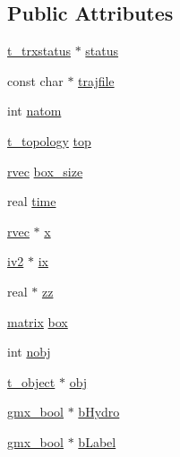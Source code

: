 \subsection*{\-Public \-Attributes}
\begin{DoxyCompactItemize}
\item 
\hyperlink{structt__trxstatus}{t\-\_\-trxstatus} $\ast$ \hyperlink{structt__manager_a89c5037729607693b806676b5ea40ddc}{status}
\item 
const char $\ast$ \hyperlink{structt__manager_affe27287f8de64fa26a53f08c71c2e9b}{trajfile}
\item 
int \hyperlink{structt__manager_aa51428daf8159772775f26bd8b29605c}{natom}
\item 
\hyperlink{structt__topology}{t\-\_\-topology} \hyperlink{structt__manager_ae5afaaf9bd7e00ae299886beb0c2675d}{top}
\item 
\hyperlink{share_2template_2gromacs_2types_2simple_8h_aa02a552a4abd2f180c282a083dc3a999}{rvec} \hyperlink{structt__manager_aa74285189d07bed0bf256da7be4f4a71}{box\-\_\-size}
\item 
real \hyperlink{structt__manager_a60f942876a3e42297e61ea208dbd319a}{time}
\item 
\hyperlink{share_2template_2gromacs_2types_2simple_8h_aa02a552a4abd2f180c282a083dc3a999}{rvec} $\ast$ \hyperlink{structt__manager_a3d0cc6a8765bec121107d8b69bc6f2d4}{x}
\item 
\hyperlink{share_2template_2gromacs_23dview_8h_a128b80c454eff54d00483f9702eb4da5}{iv2} $\ast$ \hyperlink{structt__manager_a850ad66278973e1345851a7929b52304}{ix}
\item 
real $\ast$ \hyperlink{structt__manager_a37bbd19cd371c96eb9764d79a87bbcf6}{zz}
\item 
\hyperlink{share_2template_2gromacs_2types_2simple_8h_a7ea9c2a830d3f743b887387e33645a83}{matrix} \hyperlink{structt__manager_a63a61042cfd2419905e143de65e26498}{box}
\item 
int \hyperlink{structt__manager_ac9d0b47a913f5ad493f975b363ca21b6}{nobj}
\item 
\hyperlink{structt__object}{t\-\_\-object} $\ast$ \hyperlink{structt__manager_ac9f242cc8aa9a8d0bde4f4564d8b2bd5}{obj}
\item 
\hyperlink{include_2types_2simple_8h_a8fddad319f226e856400d190198d5151}{gmx\-\_\-bool} $\ast$ \hyperlink{structt__manager_ac32e2900cbac86f59ac3ed9af7ae9076}{b\-Hydro}
\item 
\hyperlink{include_2types_2simple_8h_a8fddad319f226e856400d190198d5151}{gmx\-\_\-bool} $\ast$ \hyperlink{structt__manager_a6ae8e3d24314f737d16fb866164648ba}{b\-Label}

\end{DoxyCompactItemize}
